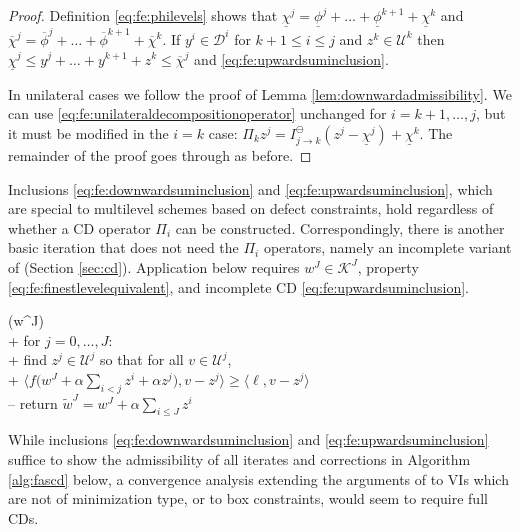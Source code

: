 \documentclass[letterpaper,final,12pt,reqno]{amsart}
\theoremstyle{cstyle}
\theoremstyle{cstyle*}
\theoremstyle{dstyle}
\numberwithin{equation}{section}
\numberwithin{figure}{section}
\numberwithin{table}{section}
\numberwithin{theorem}{section}
\newcommand{\ip}[2]{\langle#1,#2\rangle}
\begin{document}
\begin{proof}  Definition \eqref{eq:fe:philevels} shows that $\underline{\chi}^j = \underline{\phi}^j + \dots + \underline{\phi}^{k+1} + \underline{\chi}^k$ and $\overline{\chi}^j = \overline{\phi}^j + \dots + \overline{\phi}^{k+1} + \overline{\chi}^k$.  If $y^i \in \mathcal{D}^i$ for $k+1 \le i \le j$ and $z^k \in \mathcal{U}^k$ then $\underline{\chi}^j \le y^j + \dots + y^{k+1} + z^k \le \overline{\chi}^j$ and \eqref{eq:fe:upwardsuminclusion}.

In unilateral cases we follow the proof of Lemma \ref{lem:downwardadmissibility}.  We can use \eqref{eq:fe:unilateraldecompositionoperator} unchanged for $i=k+1,\dots,j$, but it must be modified in the $i=k$ case: $\Pi_k z^j = I_{j\to k}^\ominus(z^j - \underline{\chi}^j) + \underline{\chi}^k$.  The remainder of the proof goes through as before.
\end{proof}

Inclusions \eqref{eq:fe:downwardsuminclusion} and \eqref{eq:fe:upwardsuminclusion}, which are special to multilevel schemes based on defect constraints, hold regardless of whether a CD operator $\Pi_i$ can be constructed.  Correspondingly, there is another basic iteration that does not need the $\Pi_i$ operators, namely an incomplete variant of  (Section \ref{sec:cd}).  Application  below requires $w^J\in\mathcal{K}^J$, property \eqref{eq:fe:finestlevelequivalent}, and incomplete CD \eqref{eq:fe:upwardsuminclusion}.

\begin{pseudo*}
(w^J)\text{:} \\+
    for $j = 0,\dots,J$: \\+
        \rm{find} $z^j\in \mathcal{U}^j$ \rm{so that for all} $v \in \mathcal{U}^j$, \\+
            $\displaystyle \ip{f\Big(w^J + \alpha \sum_{i<j} z^i + \alpha z^j\Big)}{v-z^j} \ge \ip{\ell}{v-z^j}$ \\--
    return $\tilde w^J=w^J + \alpha \sum_{i\le J} z^i$
\end{pseudo*}

While inclusions \eqref{eq:fe:downwardsuminclusion} and \eqref{eq:fe:upwardsuminclusion} suffice to show the admissibility of all iterates and corrections in Algorithm \ref{alg:fascd} below, a convergence analysis extending the arguments of \cite{GraeserKornhuber2009,Tai2003} to VIs which are not of minimization type, or to box constraints, would seem to require full CDs.
\end{document}
